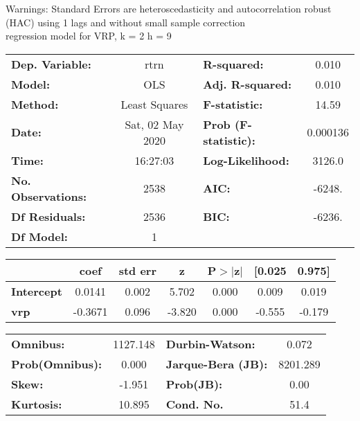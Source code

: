 Warnings: \newline
 [1] Standard Errors are heteroscedasticity and autocorrelation robust (HAC) using 1 lags and without small sample correction\\ 

regression model for VRP, k = 2 h = 9\begin{center}
\begin{tabular}{lclc}
\toprule
\textbf{Dep. Variable:}    &       rtrn       & \textbf{  R-squared:         } &     0.010   \\
\textbf{Model:}            &       OLS        & \textbf{  Adj. R-squared:    } &     0.010   \\
\textbf{Method:}           &  Least Squares   & \textbf{  F-statistic:       } &     14.59   \\
\textbf{Date:}             & Sat, 02 May 2020 & \textbf{  Prob (F-statistic):} &  0.000136   \\
\textbf{Time:}             &     16:27:03     & \textbf{  Log-Likelihood:    } &    3126.0   \\
\textbf{No. Observations:} &        2538      & \textbf{  AIC:               } &    -6248.   \\
\textbf{Df Residuals:}     &        2536      & \textbf{  BIC:               } &    -6236.   \\
\textbf{Df Model:}         &           1      & \textbf{                     } &             \\
\bottomrule
\end{tabular}
\begin{tabular}{lcccccc}
                   & \textbf{coef} & \textbf{std err} & \textbf{z} & \textbf{P$> |$z$|$} & \textbf{[0.025} & \textbf{0.975]}  \\
\midrule
\textbf{Intercept} &       0.0141  &        0.002     &     5.702  &         0.000        &        0.009    &        0.019     \\
\textbf{vrp}       &      -0.3671  &        0.096     &    -3.820  &         0.000        &       -0.555    &       -0.179     \\
\bottomrule
\end{tabular}
\begin{tabular}{lclc}
\textbf{Omnibus:}       & 1127.148 & \textbf{  Durbin-Watson:     } &    0.072  \\
\textbf{Prob(Omnibus):} &   0.000  & \textbf{  Jarque-Bera (JB):  } & 8201.289  \\
\textbf{Skew:}          &  -1.951  & \textbf{  Prob(JB):          } &     0.00  \\
\textbf{Kurtosis:}      &  10.895  & \textbf{  Cond. No.          } &     51.4  \\
\bottomrule
\end{tabular}
\end{center}

